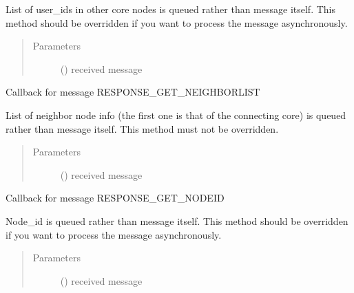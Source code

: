 \documentclass[letterpaper,10pt,english]{sphinxmanual}
\begin{document}
\begin{fulllineitems}
\begin{fulllineitems}
List of user\_ids in other core nodes is queued rather than message itself.
This method should be overridden if you want to process the message asynchronously.
\begin{quote}\begin{description}
\item[{Parameters}] \leavevmode
{} () \textendash{} received message

\end{description}\end{quote}

\end{fulllineitems}


\begin{fulllineitems}
\label{\detokenize{bbc1.core.bbc_app:bbc1.core.bbc_app.Callback.proc_resp_get_neighborlist}}
Callback for message RESPONSE\_GET\_NEIGHBORLIST

List of neighbor node info (the first one is that of the connecting core) is queued rather than message itself.
This method must not be overridden.
\begin{quote}\begin{description}
\item[{Parameters}] \leavevmode
{} () \textendash{} received message

\end{description}\end{quote}

\end{fulllineitems}


\begin{fulllineitems}
\label{\detokenize{bbc1.core.bbc_app:bbc1.core.bbc_app.Callback.proc_resp_get_node_id}}
Callback for message RESPONSE\_GET\_NODEID

Node\_id is queued rather than message itself.
This method should be overridden if you want to process the message asynchronously.
\begin{quote}\begin{description}
\item[{Parameters}] \leavevmode
{} () \textendash{} received message


\end{description}
\end{quote}
\end{fulllineitems}
\end{fulllineitems}
\end{document}

